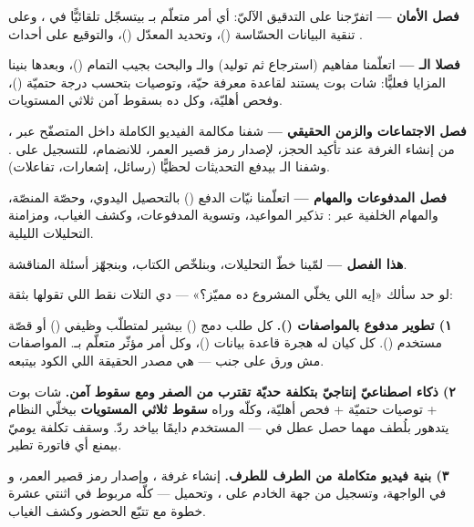 \textbf{فصل الأمان —} اتفرّجنا على التدقيق الآليّ: أي أمر متعلّم بـ\code{[Auditable]}
بيتسجّل تلقائيًّا في ، وعلى تنقية البيانات الحسّاسة
()، وتحديد المعدّل ()، والتوقيع على أحداث
.

\textbf{فصلا الـ —} اتعلّمنا مفاهيم  (استرجاع ثم توليد)
والـ والبحث بجيب التمام ()، وبعدها بنينا
المزايا فعليًّا: شات بوت يستند لقاعدة معرفة حيّة، وتوصيات بتحسب درجة حتميّة
()، وفحص أهليّة، وكل ده بسقوط آمن ثلاثي المستويات.

\textbf{فصل الاجتماعات والزمن الحقيقي —} شفنا مكالمة الفيديو الكاملة داخل المتصفّح
عبر ، من إنشاء الغرفة عند تأكيد الحجز، لإصدار رمز
قصير العمر، للانضمام، للتسجيل على . وشفنا الـ بيدفع
التحديثات لحظيًّا (رسائل، إشعارات، تفاعلات).

\textbf{فصل المدفوعات والمهام —} اتعلّمنا نيّات الدفع () بالتحصيل
اليدوي، وحصّة المنصّة، والمهام الخلفية عبر : تذكير المواعيد، وتسوية
المدفوعات، وكشف الغياب، ومزامنة التحليلات الليلية.

\textbf{هذا الفصل —} لمّينا خطّ التحليلات، وبنلخّص الكتاب، وبنجهّز أسئلة المناقشة.

\begin{summary}
لو حد سألك «إيه اللي يخلّي المشروع ده مميّز؟» — دي التلات نقط اللي تقولها بثقة:

\medskip
\textbf{١) تطوير مدفوع بالمواصفات ().} كل طلب دمج
() بيشير لمتطلّب وظيفي () أو قصّة مستخدم (). كل كيان
له هجرة قاعدة بيانات ()، وكل أمر مؤثّر متعلّم بـ\code{[Auditable]}.
المواصفات مش ورق على جنب — هي مصدر الحقيقة اللي الكود بيتبعه.

\medskip
\textbf{٢) ذكاء اصطناعيّ إنتاجيّ بتكلفة حديّة تقترب من الصفر ومع سقوط آمن.}
شات بوت  + توصيات حتميّة + فحص أهليّة، وكلّه وراه \textbf{سقوط ثلاثي
المستويات} بيخلّي النظام يتدهور بلُطف مهما حصل عطل في  — المستخدم دايمًا
بياخد ردّ. وسقف تكلفة يوميّ بيمنع أي فاتورة تطير.

\medskip
\textbf{٣) بنية فيديو متكاملة من الطرف للطرف.} إنشاء غرفة ، وإصدار رمز
قصير العمر، و في الواجهة، وتسجيل من جهة الخادم على ،
وتحميل  — كلّه مربوط في اثنتي عشرة خطوة مع تتبّع الحضور وكشف الغياب.
\end{summary}

